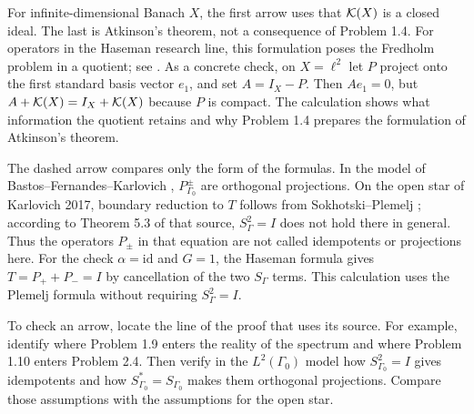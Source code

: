\noindent For infinite-dimensional Banach $X$, the first arrow uses that $\mathcal K(X)$ is a closed
ideal. The last is Atkinson's theorem, not a consequence of Problem 1.4. For operators
in the Haseman research line, this formulation poses the Fredholm problem in a quotient;
see \cite[p.~2]{Karlovich2025}. As a concrete check, on $X=\ell^2$ let $P$ project onto
the first standard basis vector $e_1$, and set $A=I_X-P$. Then $A e_1=0$, but
$A+\mathcal K(X)=I_X+\mathcal K(X)$ because $P$ is compact. The calculation shows what information
the quotient retains and why Problem 1.4 prepares the formulation of Atkinson's theorem.

\begin{center}
\end{center}

\noindent The dashed arrow compares only the form of the formulas. In the model of
Bastos--Fernandes--Karlovich \cite[§2, p.~22]{BFK2006}, $P_{\Gamma_0}^\pm$ are
orthogonal projections. On the open star of Karlovich 2017, boundary reduction to $T$
follows from Sokhotski--Plemelj \cite[pp.~463--464]{Karlovich2017}; according to
Theorem 5.3 of that source, $S_\Gamma^2=I$ does not hold there in general. Thus the
operators $P_\pm$ in that equation are not called idempotents or projections here.
For the check $\alpha=\mathrm{id}$ and $G=1$, the Haseman formula gives
$T=P_++P_-=I$ by cancellation of the two $S_\Gamma$ terms. This calculation uses
the Plemelj formula without requiring $S_\Gamma^2=I$.

\begin{reflection}
To check an arrow, locate the line of the proof that uses its source. For example, identify
where Problem 1.9 enters the reality of the spectrum and where Problem 1.10 enters Problem
2.4. Then verify in the $L^2(\Gamma_0)$ model how $S_{\Gamma_0}^2=I$ gives
idempotents and how $S_{\Gamma_0}^*=S_{\Gamma_0}$ makes them orthogonal projections.
Compare those assumptions with the assumptions for the open star.
\end{reflection}
